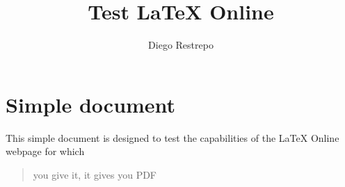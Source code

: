 \documentclass[12pt]{article}
\title{Test LaTeX Online}
\author{Diego Restrepo}
\begin{document}
\section{Simple document}
This simple document is designed to test the capabilities of the LaTeX Online webpage for which
\begin{quote}
you give it, it gives you PDF  
\end{quote}
\end{document}
